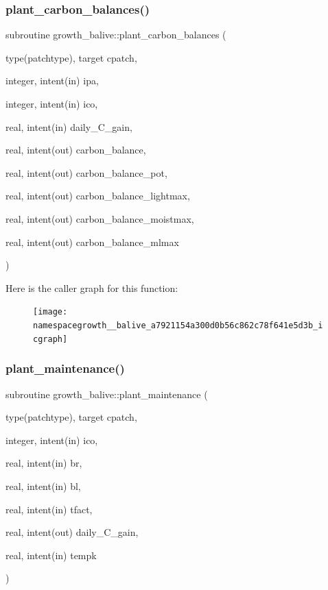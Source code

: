 \subsubsection{\texorpdfstring{plant\+\_\+carbon\+\_\+balances()}{plant\_carbon\_balances()}}
{\footnotesize\ttfamily subroutine growth\+\_\+balive\+::plant\+\_\+carbon\+\_\+balances (\begin{DoxyParamCaption}\item[{type(patchtype), target}]{cpatch,  }\item[{integer, intent(in)}]{ipa,  }\item[{integer, intent(in)}]{ico,  }\item[{real, intent(in)}]{daily\+\_\+\+C\+\_\+gain,  }\item[{real, intent(out)}]{carbon\+\_\+balance,  }\item[{real, intent(out)}]{carbon\+\_\+balance\+\_\+pot,  }\item[{real, intent(out)}]{carbon\+\_\+balance\+\_\+lightmax,  }\item[{real, intent(out)}]{carbon\+\_\+balance\+\_\+moistmax,  }\item[{real, intent(out)}]{carbon\+\_\+balance\+\_\+mlmax }\end{DoxyParamCaption})}

Here is the caller graph for this function\+:
\nopagebreak
\begin{figure}[H]
\begin{center}
\leavevmode
\texttt{[image: namespacegrowth\_\_balive\_a7921154a300d0b56c862c78f641e5d3b\_icgraph]}
\end{center}
\end{figure}
\mbox{\label{namespacegrowth__balive_af977e6b599dfde9155a3ab3cb7175f16}} 
\subsubsection{\texorpdfstring{plant\+\_\+maintenance()}{plant\_maintenance()}}
{\footnotesize\ttfamily subroutine growth\+\_\+balive\+::plant\+\_\+maintenance (\begin{DoxyParamCaption}\item[{type(patchtype), target}]{cpatch,  }\item[{integer, intent(in)}]{ico,  }\item[{real, intent(in)}]{br,  }\item[{real, intent(in)}]{bl,  }\item[{real, intent(in)}]{tfact,  }\item[{real, intent(out)}]{daily\+\_\+\+C\+\_\+gain,  }\item[{real, intent(in)}]{tempk }\end{DoxyParamCaption})}

